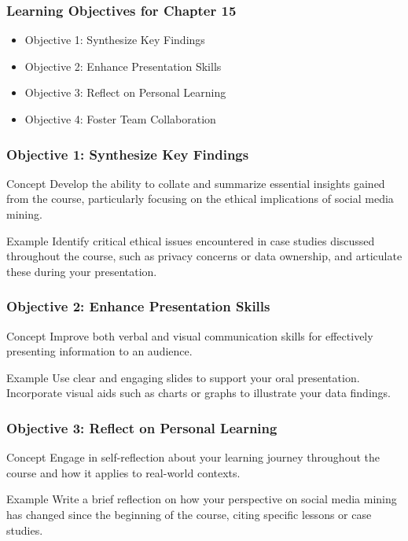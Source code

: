 \documentclass{beamer}
\begin{document}
\begin{frame}[fragile]
    \frametitle{Learning Objectives for Chapter 15}
    \begin{itemize}
        \item Objective 1: Synthesize Key Findings
        \item Objective 2: Enhance Presentation Skills
        \item Objective 3: Reflect on Personal Learning
        \item Objective 4: Foster Team Collaboration
    \end{itemize}
\end{frame}

\begin{frame}[fragile]
    \frametitle{Objective 1: Synthesize Key Findings}
    \begin{block}{Concept}
        Develop the ability to collate and summarize essential insights gained from the course, particularly focusing on the ethical implications of social media mining.
    \end{block}
    \begin{block}{Example}
        Identify critical ethical issues encountered in case studies discussed throughout the course, such as privacy concerns or data ownership, and articulate these during your presentation.
    \end{block}
\end{frame}

\begin{frame}[fragile]
    \frametitle{Objective 2: Enhance Presentation Skills}
    \begin{block}{Concept}
        Improve both verbal and visual communication skills for effectively presenting information to an audience.
    \end{block}
    \begin{block}{Example}
        Use clear and engaging slides to support your oral presentation. Incorporate visual aids such as charts or graphs to illustrate your data findings.
    \end{block}
\end{frame}

\begin{frame}[fragile]
    \frametitle{Objective 3: Reflect on Personal Learning}
    \begin{block}{Concept}
        Engage in self-reflection about your learning journey throughout the course and how it applies to real-world contexts.
    \end{block}
    \begin{block}{Example}
        Write a brief reflection on how your perspective on social media mining has changed since the beginning of the course, citing specific lessons or case studies.
    \end{block}
\end{frame}
\end{document}
